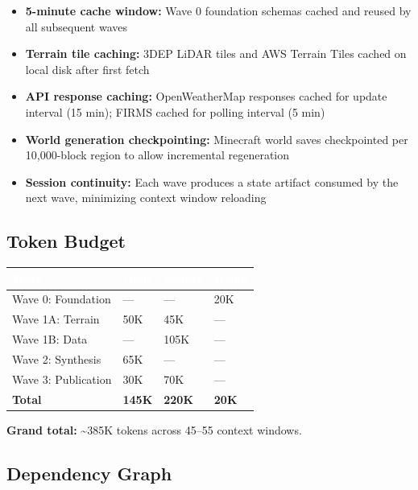 \documentclass[11pt,letterpaper]{article}
\newcommand{\tableheader}[1]{\textbf{\sffamily\textcolor{white}{#1}}}
\begin{document}
\begin{itemize}[nosep]
  \item \textbf{5-minute cache window:} Wave 0 foundation schemas cached and reused by all subsequent waves
  \item \textbf{Terrain tile caching:} 3DEP LiDAR tiles and AWS Terrain Tiles cached on local disk after first fetch
  \item \textbf{API response caching:} OpenWeatherMap responses cached for update interval (15 min); FIRMS cached for polling interval (5 min)
  \item \textbf{World generation checkpointing:} Minecraft world saves checkpointed per 10,000-block region to allow incremental regeneration
  \item \textbf{Session continuity:} Each wave produces a state artifact consumed by the next wave, minimizing context window reloading
\end{itemize}

\subsection{Token Budget}

\begin{center}
\begin{tabularx}{\textwidth}{L{4cm}C{2cm}C{2cm}C{2cm}}
\toprule
{}
\tableheader{Wave} & \tableheader{Opus} & \tableheader{Sonnet} & \tableheader{Haiku} \\
\midrule
Wave 0: Foundation & --- & --- & 20K \\
Wave 1A: Terrain & 50K & 45K & --- \\
Wave 1B: Data & --- & 105K & --- \\
Wave 2: Synthesis & 65K & --- & --- \\
Wave 3: Publication & 30K & 70K & --- \\
\midrule
\textbf{Total} & \textbf{145K} & \textbf{220K} & \textbf{20K} \\
\bottomrule
\end{tabularx}
\end{center}

\textbf{Grand total:} \textasciitilde385K tokens across 45--55 context windows.

\subsection{Dependency Graph}
\end{document}
